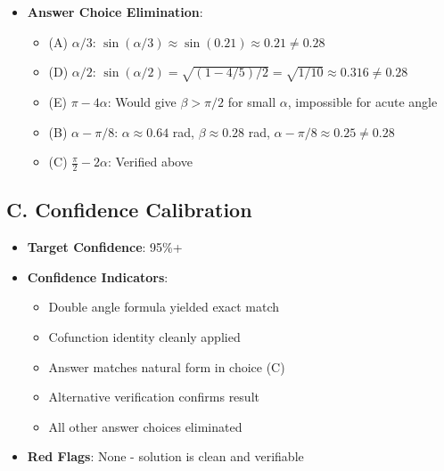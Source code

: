 \documentclass[11pt]{article}
\begin{document}
\begin{verificationbox}
\begin{itemize}[leftmargin=*]
    \item \textbf{Answer Choice Elimination}:
    \begin{itemize}
        \item (A) $\alpha/3$: $\sin(\alpha/3) \approx \sin(0.21) \approx 0.21 \neq 0.28$ \texttimes
        \item (D) $\alpha/2$: $\sin(\alpha/2) = \sqrt{(1-4/5)/2} = \sqrt{1/10} \approx 0.316 \neq 0.28$ \texttimes
        \item (E) $\pi - 4\alpha$: Would give $\beta > \pi/2$ for small $\alpha$, impossible for acute angle \texttimes
        \item (B) $\alpha - \pi/8$: $\alpha \approx 0.64$ rad, $\beta \approx 0.28$ rad, $\alpha - \pi/8 \approx 0.25 \neq 0.28$ \texttimes
        \item (C) $\frac{\pi}{2} - 2\alpha$: Verified above \checkmark
    \end{itemize}
\end{itemize}

\subsection*{C. Confidence Calibration}
\begin{itemize}[leftmargin=*]
    \item \textbf{Target Confidence}: 95\%+
    \item \textbf{Confidence Indicators}:
    \begin{itemize}
        \item[$\checkmark$] Double angle formula yielded exact match
        \item[$\checkmark$] Cofunction identity cleanly applied
        \item[$\checkmark$] Answer matches natural form in choice (C)
        \item[$\checkmark$] Alternative verification confirms result
        \item[$\checkmark$] All other answer choices eliminated
    \end{itemize}
    \item \textbf{Red Flags}: None - solution is clean and verifiable
\end{itemize}
\end{verificationbox}
\end{document}
